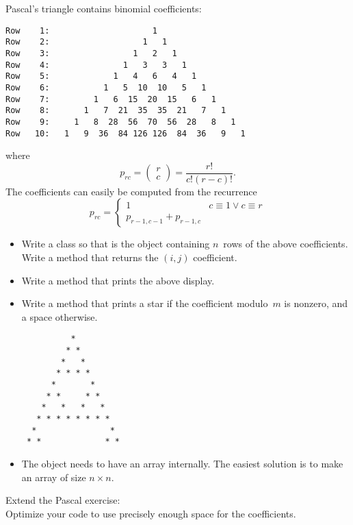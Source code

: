 \begin{block}{Pascal's triangle}
  \label{sl:pascal-def}
  \small
   contains binomial coefficients:
{\scriptsize
\begin{verbatim}
Row    1:                     1
Row    2:                   1   1
Row    3:                 1   2   1
Row    4:               1   3   3   1
Row    5:             1   4   6   4   1
Row    6:           1   5  10  10   5   1
Row    7:         1   6  15  20  15   6   1
Row    8:       1   7  21  35  35  21   7   1
Row    9:     1   8  28  56  70  56  28   8   1
Row   10:   1   9  36  84 126 126  84  36   9   1
\end{verbatim}
}
where \[ p_{rc} = \begin{pmatrix} r\\c \end{pmatrix} = \frac{r!}{c!(r-c)! }. \]
The coefficients can easily be computed from the recurrence
\[ p_{rc} = 
\begin{cases}
  1&c\equiv 1\vee c\equiv r\\
  p_{r-1,c-1}+p_{r-1,c}
\end{cases}
\]
\end{block}

\begin{exercise}
  \label{ex:pascal-ex}
  \small
  \begin{itemize}
  \item 
    Write a class  so that  is the object
    containing $n$~rows of the above coefficients. Write a method
     that returns the $(i,j)$ coefficient.
  \item
    Write a method  that prints the above display.
  \item
    Write a method  that prints a star if the
    coefficient modulo~$m$ is nonzero, and a space otherwise.
\begin{verbatim}
          *
         * *
        *   *
       * * * *
      *       *
     * *     * *
    *   *   *   *
   * * * * * * * *
  *               *
 * *             * *
\end{verbatim}
  \item
    The object needs to have an array internally. The easiest solution
    is to make an array of size $n\times n$.
  \end{itemize}
\end{exercise}

\begin{exercise}
  \label{ex:pascal-ey}
  Extend the Pascal exercise:\\
  Optimize your code to use
  precisely enough space for the coefficients.
\end{exercise}

